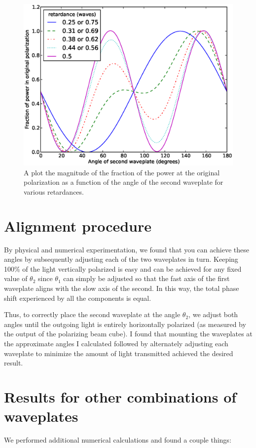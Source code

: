 \begin{figure}
    \centerline{\includegraphics{NewNotesSymmetricFig}}
    \caption[Numerical method]{\label{fig:numericalLightControlMethod}
    A plot the magnitude of the fraction of the power at the original polarization as a function of the angle of the second waveplate for various retardances.}
\end{figure}


\section{Alignment procedure}
By physical and numerical experimentation, we found that you can achieve these angles by subsequently adjusting each of the two waveplates in turn. Keeping 100\% of the light vertically polarized is easy and can be achieved for any fixed value of $\theta_2$ since $\theta_1$ can simply be adjusted so that the fast axis of the first waveplate aligns with the slow axis of the second. In this way, the total phase shift experienced by all the components is equal.

Thus, to correctly place the second waveplate at the angle  $\theta_2$, we adjust both angles until the outgoing light is entirely horizontally polarized (as measured by the output of the polarizing beam cube). I found that mounting the waveplates at the approximate angles I calculated followed by alternately adjusting each waveplate to minimize the amount of light transmitted achieved the desired result. 

\section{Results for other combinations of waveplates}
We performed additional numerical calculations and found a couple things:


